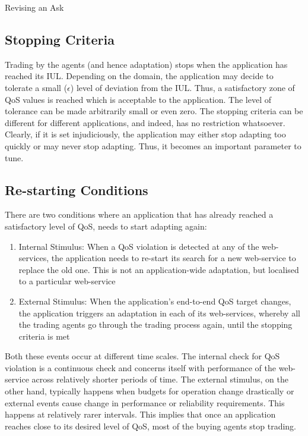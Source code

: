 \documentclass[10pt,journal,compsoc]{IEEEtran}
\begin{document}
\begin{algorithm}
 \DontPrintSemicolon
  \caption{Revising an Ask}
  \label{ask_revision}   
 \end{algorithm}
 
\subsection{Stopping Criteria}
Trading by the agents (and hence adaptation) stops when the application has reached its IUL. Depending on the domain, the application may decide to tolerate a small ($\epsilon$) level of deviation from the IUL. Thus, a satisfactory zone of QoS values is reached which is acceptable to the application. The level of tolerance can be made arbitrarily small or even zero. The stopping criteria can be different for different applications, and indeed, has no restriction whatsoever. Clearly, if it is set injudiciously, the application may either stop adapting too quickly or may never stop adapting. Thus, it becomes an important parameter to tune.

\subsection{Re-starting Conditions}
There are two conditions where an application that has already reached a satisfactory level of QoS, needs to start adapting again:
	\begin{enumerate}
	    \item Internal Stimulus: When a QoS violation is detected at any of the web-services, the application needs to re-start its search for a new web-service to replace the old one. This is not an application-wide adaptation, but localised to a particular web-service
	     \item External Stimulus: When the application's end-to-end QoS target changes, the application triggers an adaptation in each of its web-services, whereby all the trading agents go through the trading process again, until the stopping criteria is met
	\end{enumerate}
Both these events occur at different time scales. The internal check for QoS violation is a continuous check and concerns itself with performance of the web-service across relatively shorter periods of time. The external stimulus, on the other hand, typically happens when budgets for operation change drastically or external events cause change in performance or reliability requirements. This happens at relatively rarer intervals. This implies that once an application reaches close to its desired level of QoS, most of the buying agents stop trading.
\end{document}
